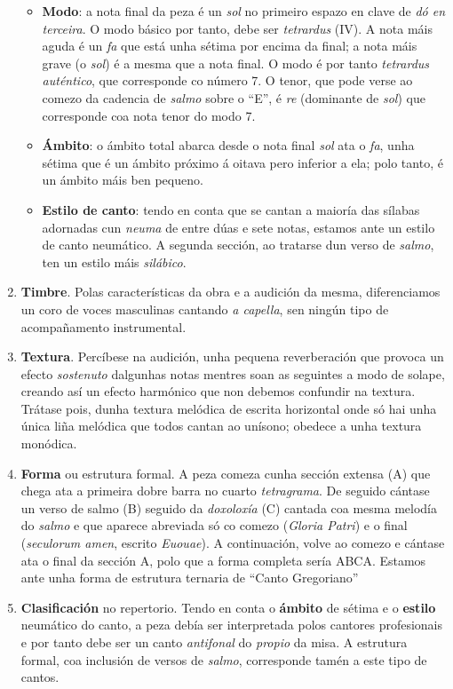 \documentclass[spanish, a4paper,nobind]{templates/ociamthesis}
\providecommand{\tightlist}{%
  \setlength{\itemsep}{0pt}\setlength{\parskip}{0pt}}
\begin{document}
\begin{enumerate}
  \begin{itemize}
  \tightlist
  \item
    \textbf{Modo}: a nota final da peza é un \emph{sol} no primeiro espazo en clave de \emph{dó en terceira}. O modo básico por tanto, debe ser \emph{tetrardus} (IV). A nota máis aguda é un \emph{fa} que está unha sétima por encima da final; a nota máis grave (o \emph{sol}) é a mesma que a nota final. O modo é por tanto \emph{tetrardus auténtico}, que corresponde co número 7. O tenor, que pode verse ao comezo da cadencia de \emph{salmo} sobre o ``E'', é \emph{re} (dominante de \emph{sol}) que corresponde coa nota tenor do modo 7.\\
  \item
    \textbf{Ámbito}: o ámbito total abarca desde o nota final \emph{sol} ata o \emph{fa}, unha sétima que é un ámbito próximo á oitava pero inferior a ela; polo tanto, é un ámbito máis ben pequeno.\\
  \item
    \textbf{Estilo de canto}: tendo en conta que se cantan a maioría das sílabas adornadas cun \emph{neuma} de entre dúas e sete notas, estamos ante un estilo de canto neumático. A segunda sección, ao tratarse dun verso de \emph{salmo}, ten un estilo máis \emph{silábico}.
  \end{itemize}
\item
  \textbf{Timbre}. Polas características da obra e a audición da mesma, diferenciamos un coro de voces masculinas cantando \emph{a capella}, sen ningún tipo de acompañamento instrumental.
\item
  \textbf{Textura}. Percíbese na audición, unha pequena reverberación que provoca un efecto \emph{sostenuto} dalgunhas notas mentres soan as seguintes a modo de solape, creando así un efecto harmónico que non debemos confundir na textura. Trátase pois, dunha textura melódica de escrita horizontal onde só hai unha única liña melódica que todos cantan ao unísono; obedece a unha textura monódica.
\item
  \textbf{Forma} ou estrutura formal. A peza comeza cunha sección extensa (A) que chega ata a primeira dobre barra no cuarto \emph{tetragrama}. De seguido cántase un verso de salmo (B) seguido da \emph{doxoloxía} (C) cantada coa mesma melodía do \emph{salmo} e que aparece abreviada só co comezo (\emph{Gloria Patri}) e o final (\emph{seculorum amen}, escrito \emph{Euouae}). A continuación, volve ao comezo e cántase ata o final da sección A, polo que a forma completa sería ABCA. Estamos ante unha forma de estrutura ternaria de ``Canto Gregoriano''
\item
  \textbf{Clasificación} no repertorio. Tendo en conta o \textbf{ámbito} de sétima e o \textbf{estilo} neumático do canto, a peza debía ser interpretada polos cantores profesionais e por tanto debe ser un canto \emph{antifonal} do \emph{propio} da misa. A estrutura formal, coa inclusión de versos de \emph{salmo}, corresponde tamén a este tipo de cantos.
\end{enumerate}
\end{document}
